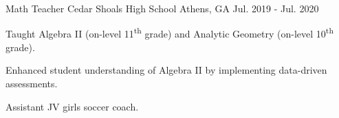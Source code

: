 \begin{cventries}
\vspace{6mm}

   \cventry
	{Math Teacher} %
	{Cedar Shoals High School} %
	{Athens, GA} %
	{Jul. 2019 - Jul. 2020} %
	{
		\begin{cvitems} %
			\item {Taught Algebra II (on-level 11\textsuperscript{th} grade) and Analytic Geometry (on-level 10\textsuperscript{th} grade).}
			\item {Enhanced student understanding of Algebra II by implementing data-driven assessments.}
			\item {Assistant JV girls soccer coach.}
		\end{cvitems}
	}
	
\vspace{6mm}





\end{cventries}
